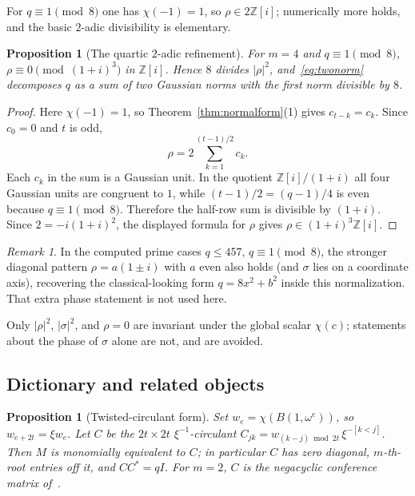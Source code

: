 \documentclass[11pt]{article}
\theoremstyle{plain}
\newtheorem{proposition}[theorem]{Proposition}
\theoremstyle{definition}
\theoremstyle{remark}
\newtheorem{remark}[theorem]{Remark}
\newcommand{\Z}{\mathbb Z}
\begin{document}
For $q\equiv1\pmod8$ one has $\chi(-1)=1$, so $\rho\in2\Z[i]$; numerically more
holds, and the basic $2$-adic divisibility is elementary.

\begin{proposition}[The quartic $2$-adic refinement]\label{prop:Lstar}
For $m=4$ and $q\equiv1\pmod8$, $\rho\equiv0\pmod{(1+i)^3}$ in $\Z[i]$. Hence
$8$ divides $|\rho|^2$, and~\eqref{eq:twonorm} decomposes $q$ as a sum of two
Gaussian norms with the first norm divisible by $8$.
\end{proposition}

\begin{proof}
Here $\chi(-1)=1$, so Theorem~\ref{thm:normalform}(1) gives
$c_{t-k}=c_k$. Since $c_0=0$ and $t$ is odd,
\[
  \rho=2\sum_{k=1}^{(t-1)/2}c_k .
\]
Each $c_k$ in the sum is a Gaussian unit. In the quotient $\Z[i]/(1+i)$ all four
Gaussian units are congruent to $1$, while
$(t-1)/2=(q-1)/4$ is even because $q\equiv1\pmod8$. Therefore the half-row sum is
divisible by $(1+i)$. Since $2=-i(1+i)^2$, the displayed formula for $\rho$
gives $\rho\in(1+i)^3\Z[i]$.
\end{proof}

\begin{remark}
In the computed prime cases $q\le457$, $q\equiv1\pmod8$, the stronger diagonal
pattern $\rho=a(1\pm i)$ with $a$ even also holds (and $\sigma$ lies on a
coordinate axis), recovering the classical-looking form $q=8x^2+b^2$ inside
this normalization. That extra phase statement is not used here.
\end{remark}

Only $|\rho|^2$, $|\sigma|^2$, and $\rho=0$ are invariant under the global
scalar $\chi(c)$; statements about the phase of $\sigma$ alone are not, and are
avoided.

\subsection{Dictionary and related objects}\label{sec:marydict}

\begin{proposition}[Twisted-circulant form]\label{prop:dictionary}
Set $w_e=\chi(B(1,\omega^e))$, so $w_{e+2t}=\xi w_e$. Let $C$ be the
$2t\times2t$ $\xi^{-1}$-circulant $C_{jk}=w_{(k-j)\bmod2t}\,\xi^{-[k<j]}$. Then
$M$ is monomially equivalent to $C$; in particular $C$ has zero diagonal,
$m$-th-root entries off it, and $CC^*=qI$. For $m=2$, $C$ is the negacyclic
conference matrix of~\cite{GS67,DGS71}.
\end{proposition}
\end{document}
